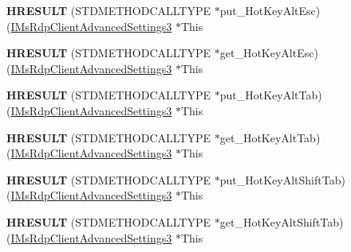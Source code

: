 \begin{DoxyCompactItemize}
{\bfseries H\+R\+E\+S\+U\+LT} (S\+T\+D\+M\+E\+T\+H\+O\+D\+C\+A\+L\+L\+T\+Y\+PE $\ast$put\+\_\+\+Hot\+Key\+Alt\+Esc)(\hyperlink{interface_m_s_t_s_c_lib_1_1_i_ms_rdp_client_advanced_settings3}{I\+Ms\+Rdp\+Client\+Advanced\+Settings3} $\ast$This
\item 
\mbox{\label{struct_m_s_t_s_c_lib_1_1_i_ms_rdp_client_advanced_settings3_vtbl_a0fe754ec75d7604364564ecb858cbe27}} 
{\bfseries H\+R\+E\+S\+U\+LT} (S\+T\+D\+M\+E\+T\+H\+O\+D\+C\+A\+L\+L\+T\+Y\+PE $\ast$get\+\_\+\+Hot\+Key\+Alt\+Esc)(\hyperlink{interface_m_s_t_s_c_lib_1_1_i_ms_rdp_client_advanced_settings3}{I\+Ms\+Rdp\+Client\+Advanced\+Settings3} $\ast$This
\item 
\mbox{\label{struct_m_s_t_s_c_lib_1_1_i_ms_rdp_client_advanced_settings3_vtbl_a3c134610d20e714e5034707cafcfe967}} 
{\bfseries H\+R\+E\+S\+U\+LT} (S\+T\+D\+M\+E\+T\+H\+O\+D\+C\+A\+L\+L\+T\+Y\+PE $\ast$put\+\_\+\+Hot\+Key\+Alt\+Tab)(\hyperlink{interface_m_s_t_s_c_lib_1_1_i_ms_rdp_client_advanced_settings3}{I\+Ms\+Rdp\+Client\+Advanced\+Settings3} $\ast$This
\item 
\mbox{\label{struct_m_s_t_s_c_lib_1_1_i_ms_rdp_client_advanced_settings3_vtbl_acdbd7def9f92d9aa15411e808cb97bae}} 
{\bfseries H\+R\+E\+S\+U\+LT} (S\+T\+D\+M\+E\+T\+H\+O\+D\+C\+A\+L\+L\+T\+Y\+PE $\ast$get\+\_\+\+Hot\+Key\+Alt\+Tab)(\hyperlink{interface_m_s_t_s_c_lib_1_1_i_ms_rdp_client_advanced_settings3}{I\+Ms\+Rdp\+Client\+Advanced\+Settings3} $\ast$This
\item 
\mbox{\label{struct_m_s_t_s_c_lib_1_1_i_ms_rdp_client_advanced_settings3_vtbl_aea7e6e564b1133dd8ed05a5e7f18f1b8}} 
{\bfseries H\+R\+E\+S\+U\+LT} (S\+T\+D\+M\+E\+T\+H\+O\+D\+C\+A\+L\+L\+T\+Y\+PE $\ast$put\+\_\+\+Hot\+Key\+Alt\+Shift\+Tab)(\hyperlink{interface_m_s_t_s_c_lib_1_1_i_ms_rdp_client_advanced_settings3}{I\+Ms\+Rdp\+Client\+Advanced\+Settings3} $\ast$This
\item 
\mbox{\label{struct_m_s_t_s_c_lib_1_1_i_ms_rdp_client_advanced_settings3_vtbl_ad8919b1c099cb396cf7084eba574828c}} 
{\bfseries H\+R\+E\+S\+U\+LT} (S\+T\+D\+M\+E\+T\+H\+O\+D\+C\+A\+L\+L\+T\+Y\+PE $\ast$get\+\_\+\+Hot\+Key\+Alt\+Shift\+Tab)(\hyperlink{interface_m_s_t_s_c_lib_1_1_i_ms_rdp_client_advanced_settings3}{I\+Ms\+Rdp\+Client\+Advanced\+Settings3} $\ast$This

\end{DoxyCompactItemize}
